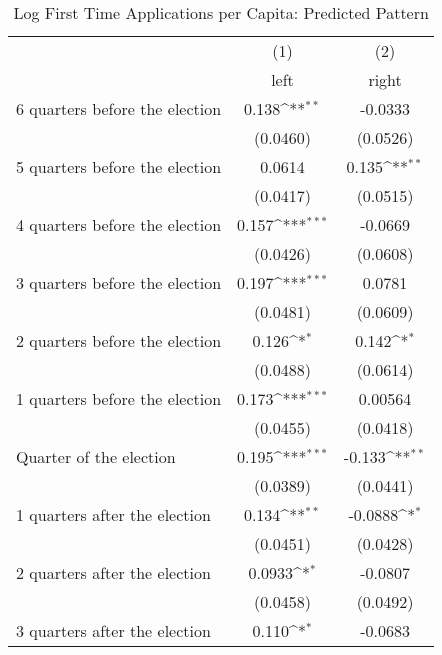 \begin{table}[htbp]\centering
\def\sym#1{\ifmmode^{#1}\else\(^{#1}\)\fi}
\caption{Log First Time Applications per Capita: Predicted Pattern}
\begin{tabular}{l*{2}{c}}
\hline\hline
                    &\multicolumn{1}{c}{(1)}&\multicolumn{1}{c}{(2)}\\
                    &\multicolumn{1}{c}{left}&\multicolumn{1}{c}{right}\\
\hline
 6 quarters before the election&       0.138\sym{**} &     -0.0333         \\
                    &    (0.0460)         &    (0.0526)         \\
[1em]
 5 quarters before the election&      0.0614         &       0.135\sym{**} \\
                    &    (0.0417)         &    (0.0515)         \\
[1em]
 4 quarters before the election&       0.157\sym{***}&     -0.0669         \\
                    &    (0.0426)         &    (0.0608)         \\
[1em]
 3 quarters before the election&       0.197\sym{***}&      0.0781         \\
                    &    (0.0481)         &    (0.0609)         \\
[1em]
 2 quarters before the election&       0.126\sym{*}  &       0.142\sym{*}  \\
                    &    (0.0488)         &    (0.0614)         \\
[1em]
 1 quarters before the election&       0.173\sym{***}&     0.00564         \\
                    &    (0.0455)         &    (0.0418)         \\
[1em]
Quarter of the election&       0.195\sym{***}&      -0.133\sym{**} \\
                    &    (0.0389)         &    (0.0441)         \\
[1em]
 1 quarters after the election&       0.134\sym{**} &     -0.0888\sym{*}  \\
                    &    (0.0451)         &    (0.0428)         \\
[1em]
 2 quarters after the election&      0.0933\sym{*}  &     -0.0807         \\
                    &    (0.0458)         &    (0.0492)         \\
[1em]
 3 quarters after the election&       0.110\sym{*}  &     -0.0683         \\

\end{tabular}
\end{table}
